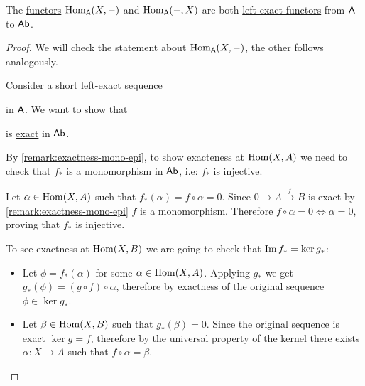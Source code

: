\documentclass[../../../main]{subfiles}
\begin{document}
\begin{example} \label{ex:hom-left-exact}
  The \hyperref[def:functor]{functors} \(\operatorname{Hom}_{\mathsf{A}}(X, -)\) and \(\operatorname{Hom}_{\mathsf{A}}(-, X)\) are both \hyperref[def:exact-complex-functor]{left-exact functors} from \(\mathsf{A}\) to \(\mathsf{Ab}\).
\end{example}
\begin{proof}
  We will check the statement about \(\operatorname{Hom}_{\mathsf{A}}(X, -)\), the other follows analogously.

  Consider a \hyperref[def:short-exact-sequence]{short left-exact sequence}
  \begin{center}
  \end{center}
  in \(\mathsf{A}\). We want to show that
  \begin{center}
  \end{center}
  is \hyperref[def:short-exact-sequence]{exact} in \(\mathsf{Ab}\).

  By \autoref{remark:exactness-mono-epi}, to show exacteness at \(\operatorname{Hom}(X, A)\) we need to check that \(f_{\ast}\) is a \hyperref[def:mono-epi-morphism]{monomorphism} in \(\mathsf{Ab}\), i.e: \(f_{\ast}\) is injective.

  Let \(\alpha \in \operatorname{Hom}(X, A)\) such that \(f_{\ast}(\alpha) = f \circ \alpha = 0\).
  Since \(0 \to A \xrightarrow{f} B\) is exact by \autoref{remark:exactness-mono-epi} \(f\) is a monomorphism.
  Therefore \(f \circ \alpha = 0 \iff \alpha = 0\), proving that \(f_{\ast}\) is injective.

  To see exactness at \(\operatorname{Hom}(X, B)\) we are going to check that \(\operatorname*{Im} f_{\ast} = \ker g_{\ast}\):
  \begin{itemize}
    \item[\(\subseteq\)] Let \(\phi = f_{\ast}(\alpha)\) for some \(\alpha \in \operatorname{Hom}(X, A)\).
          Applying \(g_{\ast}\) we get \(g_{\ast}(\phi) = (g \circ f) \circ \alpha\), therefore by exactness of the original sequence \(\phi \in \ker g_{\ast}\).
    \item[\(\supseteq\)] Let \(\beta \in \operatorname{Hom}(X, B)\) such that \(g_{\ast}(\beta) = 0\).
          Since the original sequence is exact \(\ker g = f\), therefore by the universal property of the \hyperref[def:categorical-kernel]{kernel} there exists \(\alpha: X \to A\) such that \(f \circ \alpha = \beta\).
  \end{itemize}
\end{proof}
\end{document}
